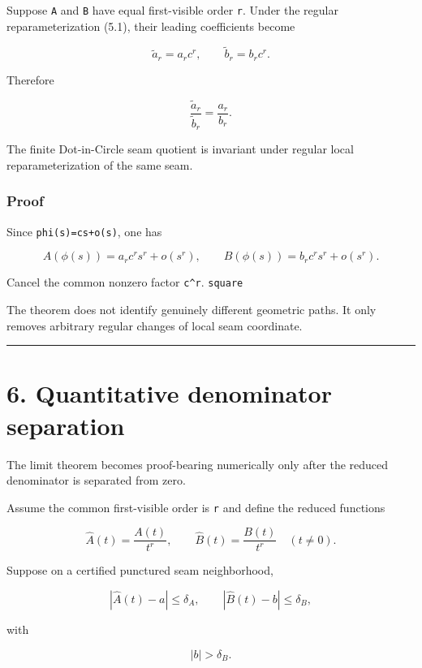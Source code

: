 Suppose \texttt{A} and \texttt{B} have equal first-visible order \texttt{r}. Under the regular
reparameterization (5.1), their leading coefficients become

\[
\widetilde a_r=a_r c^r,
\qquad
\widetilde b_r=b_r c^r.
\tag{5.2}
\]

Therefore

\[
\boxed{\frac{\widetilde a_r}{\widetilde b_r}=\frac{a_r}{b_r}.}
\tag{5.3}
\]

The finite Dot-in-Circle seam quotient is invariant under regular local
reparameterization of the same seam.

\hypertarget{proof-1}{%
\subsubsection{Proof}\label{proof-1}}

Since \texttt{phi(s)=cs+o(s)}, one has

\[
A(\phi(s))=a_r c^r s^r+o(s^r),
\qquad
B(\phi(s))=b_r c^r s^r+o(s^r).
\]

Cancel the common nonzero factor \texttt{c\^{}r}. \texttt{square}

The theorem does not identify genuinely different geometric paths. It only
removes arbitrary regular changes of local seam coordinate.

\begin{center}\rule{0.5\linewidth}{0.5pt}\end{center}

\hypertarget{quantitative-denominator-separation}{%
\section{6. Quantitative denominator separation}\label{quantitative-denominator-separation}}

The limit theorem becomes proof-bearing numerically only after the reduced
denominator is separated from zero.

Assume the common first-visible order is \texttt{r} and define the reduced functions

\[
\widehat A(t)=\frac{A(t)}{t^r},
\qquad
\widehat B(t)=\frac{B(t)}{t^r}
\quad(t\ne0).
\tag{6.1}
\]

Suppose on a certified punctured seam neighborhood,

\[
|\widehat A(t)-a|\le\delta_A,
\qquad
|\widehat B(t)-b|\le\delta_B,
\tag{6.2}
\]

with

\[
\boxed{|b|>\delta_B.}
\tag{6.3}
\]

